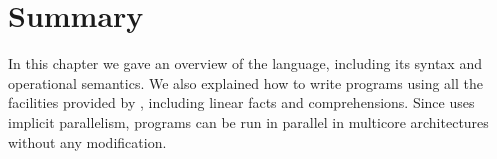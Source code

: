 \section{Summary}

In this chapter we gave an overview of the \lang language, including its syntax and operational semantics.
We also explained how to write programs using all the facilities provided by \lang, including
linear facts and comprehensions. Since \lang uses implicit parallelism, programs can be run in parallel
in multicore architectures without any modification.